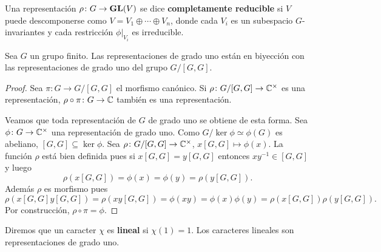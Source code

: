 \begin{definition}
Una representación $\rho\colon G\to\mathbf{GL}(V)$ se dice \textbf{completamente reducible} si
$V$ puede descomponerse como $V=V_1\oplus\cdots\oplus V_n$, donde cada $V_i$
es un subespacio $G$-invariantes y cada restricción $\phi|_{V_i}$ es irreducible.
\end{definition}



\begin{proposition}
  \label{proposition:Lin(G)}
  Sea $G$ un grupo finito. Las representaciones de grado uno están en biyección
  con las representaciones de grado uno del grupo $G/[G,G]$.
\end{proposition}

\begin{proof}
  Sea $\pi\colon G\to G/[G,G]$ el morfismo canónico. 
  Si $\rho\colon G/[G,G]\to\mathbb{C}^{\times}$ es una representación, 
  $\rho\circ\pi\colon G\to\mathbb{C}$ también es una representación. 
  
  Veamos que toda representación de $G$ de grado uno se obtiene de esta forma.
  Sea $\phi\colon G\to\mathbb{C}^\times$ una representación de grado uno. Como
  $G/\ker\phi\simeq\phi(G)$ es abeliano, $[G,G]\subseteq\ker\phi$. Sea
  $\rho\colon G/[G,G]\to\mathbb{C}^\times$, $x[G,G]\mapsto\phi(x)$. La función $\rho$
  está bien definida pues si $x[G,G]=y[G,G]$ entonces $xy^{-1}\in [G,G]$ y
  luego 
  \[
    \rho(x[G,G])=\phi(x)=\phi(y)=\rho(y[G,G]). 
  \]
  Además $\rho$ es morfismo pues
  \[
	\rho(x[G,G]y[G,G])
	=\rho(xy[G,G])=\phi(xy)
	=\phi(x)\phi(y)=\rho(x[G,G])\rho(y[G,G]).
  \]
  Por construcción, $\rho\circ\pi=\phi$.
\end{proof}

Diremos que un caracter $\chi$ es \textbf{lineal} si $\chi(1)=1$. Los caracteres lineales son representaciones de grado uno. 

